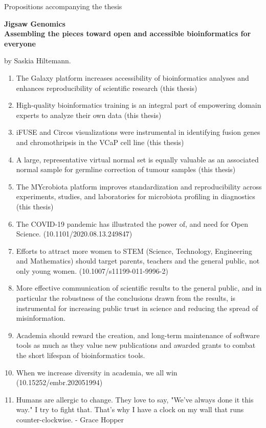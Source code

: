 \begin{center}
Propositions accompanying the thesis

\textbf{Jigsaw Genomics \ \\Assembling the pieces toward open and accessible bioinformatics for everyone}

by Saskia Hiltemann.
\end{center}



\begin{enumerate}
\item The Galaxy platform increases accessibility of bioinformatics analyses and enhances reproducibility of scientific research (this thesis)
\item High-quality bioinformatics training is an integral part of empowering domain experts to analyze their own data (this thesis)
\item iFUSE and Circos visualizations were instrumental in identifying fusion genes and chromothripsis in the VCaP cell line (this thesis)
\item A large, representative virtual normal set is equally valuable as an associated normal sample for germline correction of tumour samples (this thesis)
\item The MYcrobiota platform improves standardization and reproducibility across experiments, studies, and laboratories for microbiota profiling in diagnostics (this thesis)
\item The COVID-19 pandemic has illustrated the power of, and need for Open Science. (10.1101/2020.08.13.249847)
\item Efforts to attract more women to STEM (Science, Technology, Engineering and Mathematics) should target parents, teachers and the general public, not only young women. (10.1007/s11199-011-9996-2)
\item More effective communication of scientific results to the general public, and in particular the robustness of the conclusions drawn from the results, is instrumental for increasing public trust in science and reducing the spread of misinformation.
\item Academia should reward the creation, and long-term maintenance of software tools as much as they value new publications and awarded grants to combat the short lifespan of bioinformatics tools.
\item When we increase diversity in academia, we all win (10.15252/embr.202051994)
\item Humans are allergic to change. They love to say, "We've always done it this way." I try to fight that. That's why I have a clock on my wall that runs counter-clockwise. - Grace Hopper
\end{enumerate}
